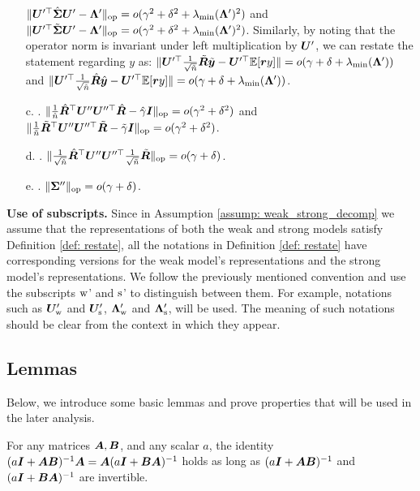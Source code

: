 \begin{definition}
\begin{itemize}
$ \lVert   {\bm{U}}'^\top\hat{{\bm{\Sigma}}}{\bm{U}}' -{\bm{\Lambda}}'  \rVert_{\mathrm{op}} = o(\gamma^2+\delta^2 + \lambda_{\min}( {\bm{\Lambda}}' )^2 ) $ and $ \lVert  {\bm{U}}'^\top\tilde{{\bm{\Sigma}}}{\bm{U}}'-{\bm{\Lambda}}'   \rVert_{\mathrm{op}} = o(\gamma^2+\delta^2 + \lambda_{\min}( {\bm{\Lambda}}' )^2 ) $. Similarly, by noting that the operator norm is invariant under left multiplication by ${\bm{U}}'$, we can restate the statement regarding $y$ as: $\|{\bm{U}}'^\top \frac{1}{\sqrt{\tilde{n}}} \tilde{{\bm{R}}}\tilde{{\bm{y}}} -{\bm{U}}'^\top  \mathbb{E}[ {\bm{r}} y ] \| = o(\gamma+\delta+\lambda_{\min}( {\bm{\Lambda}}' )) $ and $\|{\bm{U}}'^\top \frac{1}{\sqrt{\hat{n}}} \hat{{\bm{R}}}\hat{{\bm{y}}} -{\bm{U}}'^\top  \mathbb{E}[ {\bm{r}} y ] \| = o(\gamma+\delta+\lambda_{\min}( {\bm{\Lambda}}' )) $.
    \item [c.] \isotropy{}. $ \lVert \frac{1}{\hat{n}} \hat{{\bm{R}}}^\top{\bm{U}}''{\bm{U}}''^\top \hat{{\bm{R}}} -\hat{\gamma} {\bm{I}}  \rVert_{\mathrm{op}} = o(\gamma^2+\delta^2) $ and $ \lVert \frac{1}{\tilde{n}} \tilde{{\bm{R}}}^\top{\bm{U}}''{\bm{U}}''^\top \tilde{{\bm{R}}} -\tilde{\gamma} {\bm{I}}  \rVert_{\mathrm{op}} = o(\gamma^2+\delta^2) $.
    \item[d.] \smallin{}. $\lVert \frac{1}{\sqrt{\hat{n}}} \hat{{\bm{R}}}^\top {\bm{U}}''{\bm{U}}''^\top \frac{1}{\sqrt{\tilde{n}}}\tilde{{\bm{R}}} \rVert_{\mathrm{op}} = o(\gamma+\delta) $.
    \item[e.] \dimini{}. $\lVert  {\bm{\Sigma}}''  \rVert_{\mathrm{op}}=o(\gamma+\delta)$.  
\end{itemize}
\end{definition}

\textbf{Use of subscripts.}
Since in Assumption \ref{assump: weak_strong_decomp} we assume that the representations of both the weak and strong models satisfy Definition \ref{def: restate}, all the notations in Definition \ref{def: restate} have corresponding versions for the weak model's representations and the strong model's representations. We follow the previously mentioned convention and use the subscripts $\text{w}$' and $\text{s}$' to distinguish between them. For example, notations such as ${\bm{U}}'_{\text{w}}$ and ${\bm{U}}'_{\text{s}}$, ${\bm{\Lambda}}'_{\text{w}}$ and ${\bm{\Lambda}}'_{\text{s}}$, will be used. The meaning of such notations should be clear from the context in which they appear.

\subsection{Lemmas}

Below, we introduce some basic lemmas and prove properties that will be used in the later analysis.

\begin{lemma}\label{lemma: pushthrough} For any matrices ${\bm{A}}, {\bm{B}}$, and any scalar $a$, the identity $ (a{\bm{I}} + {\bm{A}}{\bm{B}})^{-1}{\bm{A}} = {\bm{A}}(a{\bm{I}}+{\bm{B}}{\bm{A}})^{-1} $ holds as long as $(a{\bm{I}} + {\bm{A}}{\bm{B}})^{-1}$ and $(a{\bm{I}}+{\bm{B}}{\bm{A}})^{-1}$ are invertible. 
\end{lemma}

